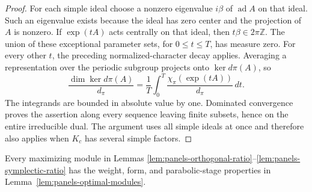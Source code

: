 \begin{proof}
For each simple ideal choose a nonzero eigenvalue $i\beta$ of
$\operatorname{ad}A$ on that ideal. Such an eigenvalue exists
because the ideal has zero center and the projection of $A$ is
nonzero. If $\exp(tA)$ acts centrally on that ideal, then
$t\beta\in2\pi\mathbb Z$. The union of these exceptional
parameter sets, for $0\leq t\leq T$, has measure zero.
For every other $t$, the preceding normalized-character decay
applies. Averaging a representation over the periodic subgroup
projects onto $\ker d\pi(A)$, so
\[
 \frac{\dim\ker d\pi(A)}{d_\pi}
 =\frac1T\int_0^T
      \frac{\chi_\pi(\exp(tA))}{d_\pi}\,dt.
\]
The integrands are bounded in absolute value by one.
Dominated convergence proves the assertion along every sequence
leaving finite subsets, hence on the entire irreducible dual.
The argument uses all simple ideals at once and therefore also
applies when $K_c$ has several simple factors.
\end{proof}

\begin{lemma}
\label{lem:panels-maximizer-forms}
Every maximizing module in Lemmas
\ref{lem:panels-orthogonal-ratio}--\ref{lem:panels-symplectic-ratio}
has the weight, form, and parabolic-stage properties in
Lemma~\ref{lem:panels-optimal-modules}.
\end{lemma}

